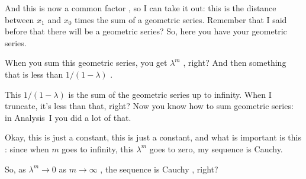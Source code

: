 \begin{proofWrapper}
\begin{speech}[00:33:27 - 00:35:09]
And this is now a common factor , so I can take it out: this is the distance between $x_1$ and $x_0$  times the sum of a geometric series. Remember that I said before that there will be a geometric series? So, here you have your geometric series.

When you sum this geometric series, you get $\lambda^m$ , right? And then something that is less than $1 / (1 - \lambda)$ .

This $1 / (1 - \lambda)$ is the sum of the geometric series up to infinity. When I truncate, it's less than that, right? Now you know how to sum geometric series: in Analysis~I you did a lot of that.
\end{speech}

\begin{speech}[00:35:09 - 00:35:47]
Okay, this is just a constant, this is just a constant, and what is important is this : since when $m$ goes to infinity, this $\lambda^m$ goes to zero, my sequence is Cauchy.

So, as $\lambda^m \to 0$ as $m \to \infty$ , the sequence is Cauchy , right?
\end{speech}


\end{proofWrapper}
